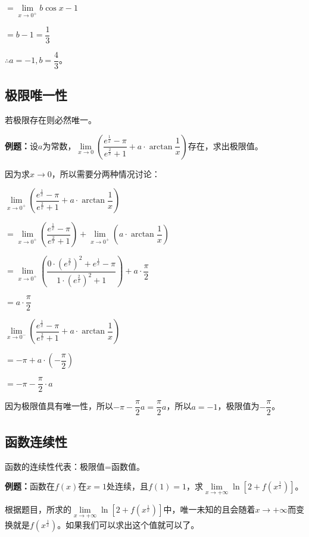 \documentclass[UTF8, 12pt]{ctexart}
\begin{document}
$=\lim\limits_{x\to 0^+}b\cos x-1$\medskip

$=b-1=\dfrac{1}{3}$\medskip

$\therefore a=-1,b=\dfrac{4}{3}$。

\subsection{极限唯一性}

若极限存在则必然唯一。

\textbf{例题：}设$a$为常数，$\lim\limits_{x\to 0}\left(\dfrac{e^{\frac{1}{x}}-\pi}{e^{\frac{2}{x}}+1}+a\cdot\arctan\dfrac{1}{x}\right)$存在，求出极限值。

因为求$x\to 0$，所以需要分两种情况讨论：

\medskip

$\lim\limits_{x\to 0^+}\left(\dfrac{e^{\frac{1}{x}}-\pi}{e^{\frac{2}{x}}+1}+a\cdot\arctan\dfrac{1}{x}\right)$

$= \lim\limits_{x\to 0^+}\left(\dfrac{e^{\frac{1}{x}}-\pi}{e^{\frac{2}{x}}+1}\right)+\lim\limits_{x\to 0^+}\left(a\cdot\arctan\dfrac{1}{x}\right)$

$= \lim\limits_{x\to 0^+}\left(\dfrac{0\cdot\left(e^{\frac{2}{x}}\right)^2+e^{\frac{1}{x}}-\pi}{1\cdot\left(e^{\frac{2}{x}}\right)^2+1}\right)+a\cdot\dfrac{\pi}{2}$

$= a\cdot\dfrac{\pi}{2}$

\medskip

$\lim\limits_{x\to 0^-}\left(\dfrac{e^{\frac{1}{x}}-\pi}{e^{\frac{2}{x}}+1}+a\cdot\arctan\dfrac{1}{x}\right)$

$= -\pi+a\cdot\left(-\dfrac{\pi}{2}\right)$

$= -\pi-\dfrac{\pi}{2}\cdot a$

因为极限值具有唯一性，所以$-\pi-\dfrac{\pi}{2}a=\dfrac{\pi}{2}a$，所以$a=-1$，极限值为$-\dfrac{\pi}{2}$。

\subsection{函数连续性}

函数的连续性代表：极限值=函数值。

\textbf{例题：}函数在$f(x)$在$x=1$处连续，且$f(1)=1$，求$\lim\limits_{x\to+\infty}\ln\left[2+f\left(x^{\frac{1}{x}}\right)\right]$。

根据题目，所求的$\lim\limits_{x\to+\infty}\ln\left[2+f\left(x^{\frac{1}{x}}\right)\right]$中，唯一未知的且会随着$x\to+\infty$而变换就是$f\left(x^{\frac{1}{x}}\right)$。如果我们可以求出这个值就可以了。
\end{document}
